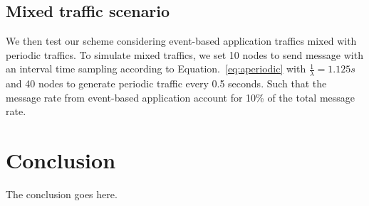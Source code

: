 \documentclass[journal]{IEEEtran}
\begin{document}
\subsection{Mixed traffic scenario}
We then test our scheme considering event-based application traffics mixed with periodic traffics. To simulate mixed traffics, we set 10 nodes to send message with an interval time sampling according to Equation.~\ref{eq:aperiodic} with $\frac{1}{\lambda}=1.125s$ and 40 nodes to generate periodic traffic every 0.5 seconds. Such that the message rate from event-based application account for 10\% of the total message rate.

\section{Conclusion}
The conclusion goes here.


%


\end{document}
